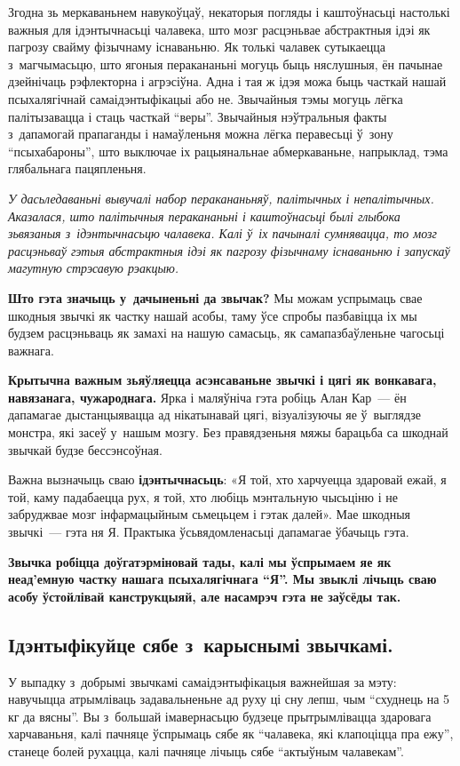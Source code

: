 Згодна зь меркаваньнем навукоўцаў, некаторыя погляды і каштоўнасьці настолькі важныя для ідэнтычнасьці чалавека, што мозг расцэньвае абстрактныя ідэі як пагрозу свайму фізычнаму існаваньню. Як толькі чалавек сутыкаецца з~магчымасьцю, што ягоныя перакананьні могуць быць няслушныя, ён пачынае дзейнічаць рэфлекторна і агрэсіўна. Адна і тая ж ідэя можа быць часткай нашай псыхалягічнай самаідэнтыфікацыі або не. Звычайныя тэмы могуць лёгка палітызавацца і стаць часткай ``веры''. Звычайныя нэўтральныя факты з~дапамогай прапаганды і намаўленьня можна лёгка перавесьці ў~зону ``псыхабароны'', што выключае іх рацыянальнае абмеркаваньне, напрыклад, тэма глябальнага пацяпленьня.

\emph{У дасьледаваньні вывучалі набор перакананьняў, палітычных і непалітычных. Аказалася, што палітычныя перакананьні і каштоўнасьці былі глыбока зьвязаныя з~ідэнтычнасьцю чалавека. Калі ў~іх пачыналі сумнявацца, то мозг расцэньваў гэтыя абстрактныя ідэі як пагрозу фізычнаму існаваньню і запускаў магутную стрэсавую рэакцыю.}

\textbf{Што гэта значыць у~дачыненьні да звычак?} Мы можам успрымаць свае шкодныя звычкі як частку нашай асобы, таму ўсе спробы пазбавіцца іх мы будзем расцэньваць як замахі на нашую самасьць, як самапазбаўленьне чагосьці важнага. 

\textbf{Крытычна важным зьяўляецца асэнсаваньне звычкі і цягі як вонкавага, навязанага, чужароднага.} Ярка і маляўніча гэта робіць Алан Кар~--- ён дапамагае дыстанцыявацца ад нікатынавай цягі, візуалізуючы яе ў~выглядзе монстра, які засеў у~нашым мозгу. Без правядзеньня мяжы барацьба са шкоднай звычкай будзе бессэнсоўная.

Важна вызначыць сваю \textbf{ідэнтычнасьць}: «Я той, хто харчуецца здаровай ежай, я той, каму падабаецца рух, я той, хто любіць мэнтальную чысьціню і не забруджвае мозг інфармацыйным сьмецьцем і гэтак далей». Мае шкодныя звычкі~--- гэта ня Я. Практыка ўсьвядомленасьці дапамагае ўбачыць гэта.

\textbf{Звычка робіцца доўгатэрміновай тады, калі мы ўспрымаем яе як неад'емную частку нашага псыхалягічнага ``Я''. Мы звыклі лічыць сваю асобу ўстойлівай канструкцыяй, але насамрэч гэта не заўсёды так.} 

\subsection*{Ідэнтыфікуйце сябе з~карыснымі звычкамі.}

У выпадку з~добрымі звычкамі самаідэнтыфікацыя важнейшая за мэту: навучыцца атрымліваць задавальненьне ад руху ці сну лепш, чым ``схуднець на 5 кг да вясны''. Вы з~большай імавернасьцю будзеце прытрымлівацца здаровага харчаваньня, калі пачняце ўспрымаць сябе як ``чалавека, які клапоціцца пра ежу'', станеце болей рухацца, калі пачняце лічыць сябе ``актыўным чалавекам''.

